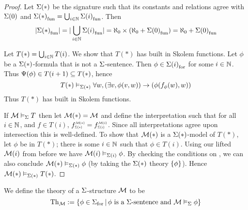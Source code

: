 \begin{proof}
    Let $\Sigma(*)$ 
    be the signature such that its constants and relations agree with $\Sigma(0)$
    and ${\Sigma(*)}_\mathrm{fun} = \bigcup_{i \in \mathbb{N}} {\Sigma(i)}_\mathrm{fun}$.
    Then 
    \[
        |{\Sigma(*)}_\mathrm{fun}| = |\bigcup_{i \in \mathbb{N}} {\Sigma(i)}_\mathrm{fun}| = 
        \aleph_0 \times (\aleph_0 + {\Sigma(0)}_\mathrm{fun}) = 
        \aleph_0 + {\Sigma(0)}_\mathrm{fun}
    \]

    Let $T(*) = \bigcup_{i \in \mathbb{N}} T(i)$.
    We show that $T(*)$ has built in Skolem functions.
    Let $\phi$ be a $\Sigma(*)$-formula that is not a $\Sigma$-sentence.
    Then $\phi \in {\Sigma(i)}_\mathrm{for}$ for some $i \in \mathbb{N}$. 
    Thus $\Psi(\phi) \in T(i+1) \subseteq T(*)$,
    hence 
    \[T(*) \vDash_{\Sigma(*)} \forall w, (\exists v, \phi(v,w)) 
    \to (\phi(f_\phi (w),w))\]
    Thus $T(*)$ has built in Skolem functions.
    
    If $\mathcal{M} \vDash_{\Sigma} T$ then let ${\mathcal{M}(*)} = {\mathcal{M}}$ 
    and define the interpretation such that for all $i \in \mathbb{N}$, 
    and $f \in T(i)$, 
    $\subintp{\Si(*)}{\MM(*)}{f} = \subintp{\Si(i)}{\MM(i)}{f}$.
    Since all interpretations agree upon intersection this is well-defined.
    To show that $\mathcal{M}(*)$ is a $\Sigma(*)$-model of $T(*)$,
    let $\phi$ be in $T(*)$; 
    there is some $i \in \mathbb{N}$ such that $\phi \in T(i)$.
    Using our lifted $\mathcal{M}(i)$ from before we have 
    $\mathcal{M}(i) \vDash_{\Sigma(i)} \phi$.
    By checking the conditions on ,
    we can also conclude
    $\mathcal{M}(*) \vDash_{\Sigma(*)} \phi$
    (by taking the $\Sigma(*)$ theory $\left\{\phi\right\}$).
    Hence
    $\mathcal{M}(*) \vDash_{\Sigma(*)} T(*)$.
\end{proof}

\begin{dfn}
    We define the theory of a $\Sigma$-structure $\mathcal{M}$ to be
    \[\mathrm{Th}_{\mathcal{M}} := \left\{\phi \in {\Sigma}_\mathrm{for} \,|\, 
    \phi \text{ is a $\Sigma$-sentence and } \mathcal{M} \vDash_{\Sigma} \phi\right\}\]
\end{dfn}

